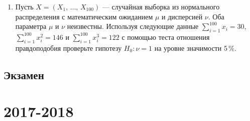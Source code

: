 \documentclass[12pt, a4paper]{article}\usepackage[]{graphicx}\usepackage[]{color}
\begin{document}
\begin{enumerate}
\item Пусть $X = (X_1, \, \ldots, \, X_{100})$ — случайная выборка из нормального распределения с математическим ожиданием $\mu$ и дисперсией $\nu$. Оба параметра $\mu$ и $\nu$ неизвестны. Используя следующие данные $\sum_{i=1}^{100}x_i = 30$, $\sum_{i=1}^{100}x_i^2 = 146$ и $\sum_{i=1}^{100}x_i^3 = 122$ с помощью теста отношения правдоподобия проверьте гипотезу $H_0 \colon \nu = 1$ на уровне значимости 5\,\%.

\end{enumerate}


\subsection{Экзамен}



\section{2017-2018}
\end{document}
